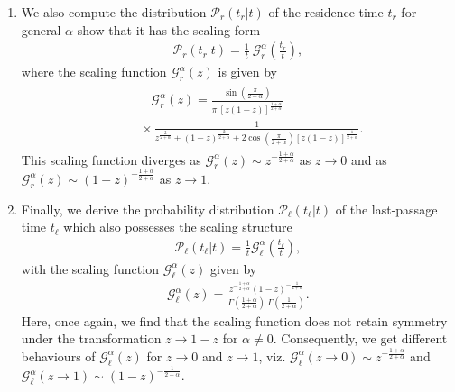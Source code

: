 \documentclass[showpacs,amsmath,amssymb,aps,pre,twocolumn,]{revtex4-1}
\begin{document}
\begin{enumerate}
\item We also compute the distribution $\mathcal{P}_r(t_r|t)$ of the residence time $t_r$ for general $\alpha$ show that it has the scaling form
\begin{align}
\mathcal{P}_r(t_r|t) = \frac{1}{t} ~\mathcal{G} _{r}^{\alpha} \left( \frac{t_r}{t}\right),
\label{resi-eq-8}
\end{align}
where the scaling function $\mathcal{G} _{r}^{\alpha} \left( z \right)$ is given by
\begin{align}
\begin{split}
& ~~~~~~~~~~\mathcal{G} _{r}^{\alpha} \left( z \right) = \frac{ \sin \left( \frac{\pi}{2+\alpha}\right) }{\pi~ \left[ z(1-z) \right]^{\frac{1+\alpha}{2+\alpha}}} \\
&~~~~~~ \times \frac{1}{z^{\frac{2}{2+\alpha}}+(1-z)^{\frac{2}{2+\alpha}}+2  \cos \left( \frac{\pi}{2+\alpha}\right) \left[z(1-z) \right] ^{\frac{1}{2+\alpha}}}.
\end{split} 
\label{resi-eq-9}
\end{align}
This scaling function diverges as $\mathcal{G} _{r}^{\alpha} \left( z \right) \sim z^{-\frac{1+\alpha}{2+\alpha}}$ as $z \to 0$ and as $\mathcal{G} _{r}^{\alpha} \left( z \right) \sim (1-z)^{-\frac{1+\alpha}{2+\alpha}}$ as $z \to 1$.

\item Finally, we derive the probability distribution $\mathcal{P}_{ \ell } \left( t_{\ell}|t \right)$ of the last-passage time $t_{\ell}$ which also possesses the scaling structure
\begin{align}
\mathcal{P}_{ \ell } \left( t_{\ell}|t \right) = \frac{1}{t} \mathcal{G}_{\ell}^{\alpha} \left( \frac{t_{\ell}}{t}\right),
\label{last-passage-time-eq-7}
\end{align}
with the scaling function $\mathcal{G}_{\ell}^{\alpha} \left( z \right)$ given by
\begin{align}
\mathcal{G}_{\ell}^{\alpha} \left( z \right) = \frac{z^{-\frac{1+\alpha}{2+\alpha}} \left( 1-z \right) ^{-\frac{1}{2+\alpha}}}{\Gamma \left( \frac{1+\alpha}{2+\alpha}\right)~\Gamma \left( \frac{1}{2+\alpha}\right)}.
\label{last-passage-time-eq-9}
\end{align}
Here, once again, we find that the scaling function does not retain symmetry under the transformation $z \to 1-z$ for $\alpha \neq 0$. Consequently, we get different behaviours of $\mathcal{G}_{\ell}^{\alpha} \left( z \right)$ for $z \to 0$ and $z \to 1$, viz. $\mathcal{G} _{\ell }^{\alpha} \left( z \to 0 \right) \sim z^{-\frac{1+\alpha}{2+\alpha}}$ and $\mathcal{G} _{ \ell }^{\alpha} \left( z \to 1 \right) \sim (1-z)^{-\frac{1}{2+\alpha}}$.

\end{enumerate}
\end{document}
